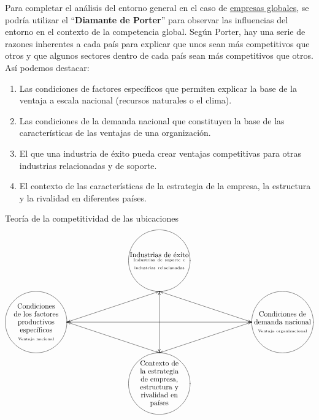 \documentclass[10pt,a4paper,spanish]{report}
\begin{document}
            Para completar el análisis del entorno general en el caso de \underline{empresas globales}, se podría utilizar el ``\textbf{Diamante de Porter}'' para observar las influencias del entorno en el contexto de la competencia global. Según Porter, hay una serie de razones inherentes a cada país para explicar que unos sean más competitivos que otros y que algunos sectores dentro de cada país sean más competitivos que otros. Así podemos destacar:
            \begin{enumerate}
                  \item Las condiciones de factores específicos que permiten explicar la base de la ventaja a escala nacional (recursos naturales o el clima).
                  \item Las condiciones de la demanda nacional que constituyen la base de las características de las ventajas de una organización.
                  \item El que una industria de éxito pueda crear ventajas competitivas para otras industrias relacionadas y de soporte.
                  \item El contexto de las características de la estrategia de la empresa, la estructura y la rivalidad en diferentes países.
            \end{enumerate}
            \begin{center}
            {\LARGE \textcolor[rgb]{0.3,0.4,0.6}{Teoría de la competitividad de las ubicaciones}}
            \[\begin{xy}
            ,(0,0)*+=[o]=<3cm>[F]\txt<3cm>{Contexto de la estrategia de empresa, estructura y rivalidad en\\países}
            ,(0,60)*+=[o]=<3cm>[F]\txt<3cm>{Industrias de éxito\\{\tiny Industrias de soporte e industrias relacionadas}}
            ,(-60,30)*+=[o]=<3cm>[F]\txt<3cm>{Condiciones de los factores productivos específicos\\{\tiny Ventaja nacional}}
            ,(60,30)*+=[o]=<3cm>[F]\txt<3cm>{Condiciones de demanda nacional\\{\tiny Ventaja organizacional}}
            \ar@{<->} (0,15);(0,45)
            \ar@{<->} (-45,30);(45,30)
            \ar@{<->} (0,45);(45,30)
            \ar@{<->} (45,30);(0,15)
            \ar@{<->} (0,15);(-45,30)
            \ar@{<->} (-45,30);(0,45)
            \end{xy}\]
            \end{center}
\end{document}
